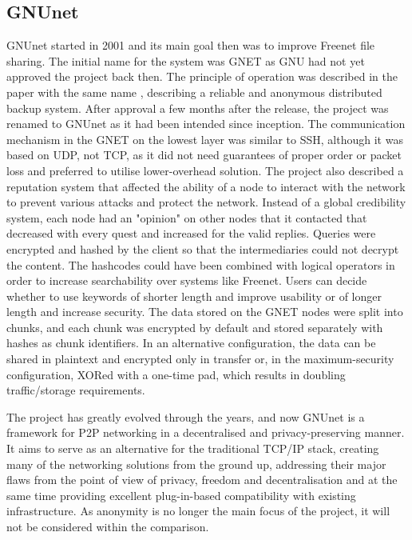 \subsection{GNUnet}
GNUnet started in 2001 and its main goal then was to improve Freenet file sharing. The initial name for the system was GNET as GNU had not yet approved the project back then. The principle of operation was described in the paper with the same name \cite{gnet}, describing a reliable and anonymous distributed backup system. After approval a few months after the release, the project was renamed to GNUnet as it had been intended since inception. The communication mechanism in the GNET on the lowest layer was similar to SSH, although it was based on UDP, not TCP, as it did not need guarantees of proper order or packet loss and preferred to utilise lower-overhead solution. The project also described a reputation system that affected the ability of a node to interact with the network to prevent various attacks and protect the network. Instead of a global credibility system, each node had an "opinion" on other nodes that it contacted that decreased with every quest and increased for the valid replies. Queries were encrypted and hashed by the client so that the intermediaries could not decrypt the content. The hashcodes could have been combined with logical operators in order to increase searchability over systems like Freenet. Users can decide whether to use keywords of shorter length and improve usability or of longer length and increase security. The data stored on the GNET nodes were split into chunks, and each chunk was encrypted by default and stored separately with hashes as chunk identifiers. In an alternative configuration, the data can be shared in plaintext and encrypted only in transfer or, in the maximum-security configuration, XORed with a one-time pad, which results in doubling traffic/storage requirements.

The project has greatly evolved through the years, and now GNUnet is a framework for P2P networking in a decentralised and privacy-preserving manner. It aims to serve as an alternative for the traditional TCP/IP stack, creating many of the networking solutions from the ground up, addressing their major flaws from the point of view of privacy, freedom and decentralisation and at the same time providing excellent plug-in-based compatibility with existing infrastructure. As anonymity is no longer the main focus of the project, it will not be considered within the comparison.


